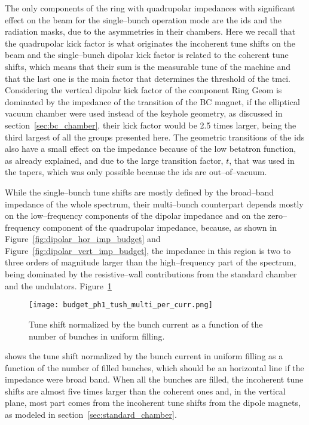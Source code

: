     The only components of the ring with quadrupolar impedances with significant effect on the beam for the single--bunch operation mode are the \glspl{id} and the radiation masks, due to the asymmetries in their chambers. Here we recall that the quadrupolar kick factor is what originates the incoherent tune shifts on the beam and the single--bunch dipolar kick factor is related to the coherent tune  shifts, which means that their sum is the measurable tune of the machine and that the last one is the main factor that determines the threshold of the \gls{tmci}. Considering the vertical dipolar kick factor of the component Ring Geom is dominated by the impedance of the transition of the BC magnet, if the elliptical vacuum chamber were used instead of the keyhole geometry, as discussed in section~\ref{sec:bc_chamber}, their kick factor would be \num{2.5} times larger, being the third largest of all the groups presented here. The geometric transitions of the \glspl{id} also have a small effect on the impedance because of the low betatron function, as already explained, and due to the large transition factor, $t$, that was used in the tapers, which was only possible because the \glspl{id} are out--of--vacuum.

    While the single--bunch tune shifts are mostly defined by the broad--band impedance of the whole spectrum, their multi--bunch counterpart depends mostly on the low--frequency components of the dipolar impedance and on the zero--frequency component of the quadrupolar impedance, because, as shown in Figure~\ref{fig:dipolar_hor_imp_budget} and Figure~\ref{fig:dipolar_vert_imp_budget}, the impedance in this region is two to three orders of magnitude larger than the high--frequency part of the spectrum, being dominated by the resistive--wall contributions from the standard chamber and the undulators.
    Figure~\ref{fig:ph1_tush_multi_per_curr}
    \begin{figure}
        \centering
        \texttt{[image: budget\_ph1\_tush\_multi\_per\_curr.png]}
        \caption{Tune shift normalized by the bunch current as a function of the number of bunches in uniform filling.}
        \label{fig:ph1_tush_multi_per_curr}
    \end{figure}
    shows the tune shift normalized by the bunch current in uniform filling as a function of the number of filled bunches, which should be an horizontal line if the impedance were broad band. When all the bunches are filled, the incoherent tune shifts are almost five times larger than the coherent ones and, in the vertical plane, most part comes from the  incoherent tune shifts from the dipole magnets, as modeled in section~\ref{sec:standard_chamber}.


